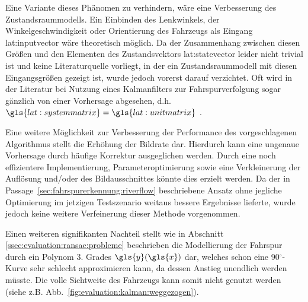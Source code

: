 Eine Variante dieses Phänomen zu verhindern, wäre eine Verbesserung des Zustandsraummodells. 
Ein Einbinden des Lenkwinkels, der Winkelgeschwindigkeit oder Orientierung des Fahrzeugs als Eingang \gls{lat:inputvector} wäre theoretisch möglich. Da der Zusammenhang zwischen diesen Größen und den Elementen des Zustandsvektors \gls{lat:statevector} leider nicht trivial ist und keine Literaturquelle vorliegt, in der ein Zustandsraummodell mit diesen Eingangsgrößen gezeigt ist, wurde jedoch vorerst darauf verzichtet. Oft wird in der Literatur bei Nutzung eines Kalmanfilters zur Fahrspurverfolgung sogar gänzlich von einer Vorhersage abgesehen, d.h. \(\gls{lat:systemmatrix}=\gls{lat:unitmatrix}\) \autocite{limRiverFlowLane2012}.

Eine weitere Möglichkeit zur Verbesserung der Performance des vorgeschlagenen Algorithmus stellt die Erhöhung der Bildrate dar. Hierdurch kann eine ungenaue Vorhersage durch häufige Korrektur ausgeglichen werden. Durch eine noch effizientere Implementierung, Parameteroptimierung sowie eine Verkleinerung der Auflösung und/oder des Bildausschnittes könnte dies erzielt werden. Da der in Passage~\ref{sec:fahrspurerkennung:riverflow} beschriebene Ansatz ohne jegliche Optimierung im jetzigen Testszenario weitaus bessere Ergebnisse lieferte, wurde jedoch keine weitere Verfeinerung dieser Methode vorgenommen.

Einen weiteren signifikanten Nachteil stellt wie in Abschnitt \ref{ssec:evaluation:ransac:probleme} beschrieben die Modellierung der Fahrspur durch ein Polynom 3. Grades \(\gls{y}(\gls{x})\) dar, welches schon eine 90\(^\circ\)-Kurve sehr schlecht approximieren kann, da dessen Anstieg unendlich werden müsste. Die volle Sichtweite des Fahrzeugs kann somit nicht genutzt werden (siehe z.B. Abb.~\ref{fig:evaluation:kalman:weggezogen}).




